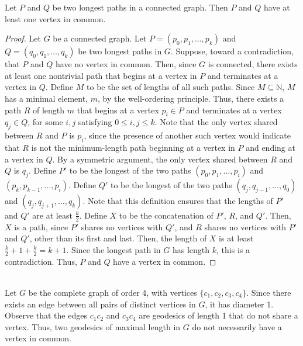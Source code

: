 \documentclass[12pt]{article}
\begin{document}
\newpage
{}

 Let $P$ and $Q$ be two longest paths in a connected graph. Then $P$ and $Q$ have at least one vertex in common.
\begin{proof}
    Let $G$ be a connected graph.
    Let $P=(p_0, p_1,\hdots,p_k)$ and $Q=(q_0, q_1,\hdots, q_k)$ be two longest paths in $G$.
    Suppose, toward a contradiction, that $P$ and $Q$ have no vertex in common.
    Then, since $G$ is connected, there exists at least one nontrivial path that begins at a vertex in $P$ and terminates at a vertex in $Q$.
    Define $M$ to be the set of lengths of all such paths.
    Since $M \subseteq \mathbb N$, $M$ has a minimal element, $m$, by the well-ordering principle.
    Thus, there exists a path $R$ of length $m$ that begins at a vertex $p_i \in P$ and terminates at a vertex $q_j \in Q$, for some $i,j$ satisfying $0 \leq i,j \leq k$.
    Note that the only vertex shared between $R$ and $P$ is $p_i$, since the presence of another such vertex would indicate that $R$ is not the minimum-length path beginning at a vertex in $P$ and ending at a vertex in $Q$.
    By a symmetric argument, the only vertex shared between $R$ and $Q$ is $q_j$.
    Define $P'$ to be the longest of the two paths $(p_0, p_1, \hdots, p_i)$ and $(p_k, p_{k-1}, \hdots, p_i)$. %
    Define $Q'$ to be the longest of the two paths $(q_j, q_{j-1}, \hdots, q_0)$ and $(q_j, q_{j+1}, \hdots, q_k)$.
    Note that this definition ensures that the lengths of $P'$ and $Q'$ are at least $\frac k2$.
    Define $X$ to be the concatenation of $P'$, $R$, and $Q'$.
   Then, $X$ is a path, since $P'$ shares no vertices with $Q'$, and $R$ shares no vertices with $P'$ and $Q'$, other than its first and last.
    Then, the length of $X$ is at least $\frac k2 + 1 + \frac k2 = k + 1$.
    Since the longest path in $G$ has length $k$, this is a contradiction.
    Thus, $P$ and $Q$ have a vertex in common.
\end{proof}
\medskip
{}\\
    Let $G$ be the complete graph of order 4, with vertices $\{c_1, c_2, c_3, c_4\}$.
    Since there exists an edge between all pairs of distinct vertices in $G$, it has diameter 1.
    Observe that the edges $c_1c_2$ and $c_3c_4$ are geodesics of length 1 that do not share a vertex.
    Thus, two geodesics of maximal length in $G$ do not necessarily have a vertex in common.
\end{document}
